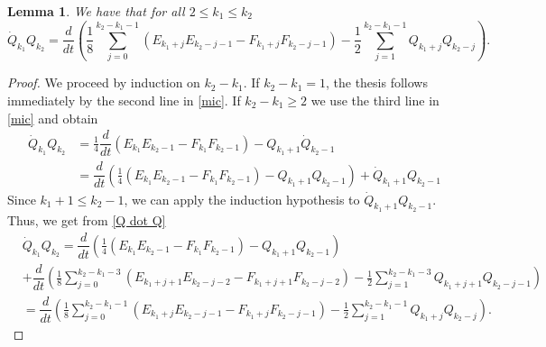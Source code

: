 \documentclass[reqno,11pt]{amsart}
\theoremstyle{plain}
\numberwithin{equation}{section}
\newtheorem{lemma}[theorem]{Lemma}
\newcommand{\ddt}{\dfrac{d}{dt}}
\begin{document}
{\begin{lemma}\label{provo}
	We have that for all $2\leq  k_1 \leq  k_2$
	\begin{equation}
		\dot{Q}_{k_1}Q_{k_2}=\ddt \left( \frac18 \sum_{j=0}^{k_2-k_1-1}(E_{k_1+j}E_{k_2-j-1}-F_{k_1+j}F_{k_2-j-1}) - \frac12 \sum_{j=1}^{k_2-k_1-1} Q_{k_1+j} Q_{k_2-j} \right).
	\end{equation}
\end{lemma}
\begin{proof}
	We proceed by induction on $k_2-k_1$. If $k_2-k_1=1$, the thesis follows immediately by the second line in \eqref{mic}.
	If $k_2-k_1\geq2$ we use the third line in \eqref{mic} and obtain
	\begin{equation}\label{Q dot Q}
		\begin{aligned}
			\dot{Q}_{k_1}Q_{k_2}
			&= \frac14\ddt ( E_{k_1}E_{k_2-1}-F_{k_1}F_{k_2-1}) - Q_{k_1+1} \dot Q_{k_2-1}
			\\
			&= \ddt\left( \frac14( E_{k_1}E_{k_2-1}-F_{k_1}F_{k_2-1}) - Q_{k_1+1} Q_{k_2-1}\right) + \dot Q_{k_1+1} Q_{k_2-1}
		\end{aligned}
	\end{equation}
	Since $k_1+1\leq k_2-1$, we can apply the induction hypothesis to $\dot Q_{k_1+1} Q_{k_2-1}$. Thus, we get from \eqref{Q dot Q}
	\begin{equation}\label{Q dot Q 2}
		\begin{aligned}
			&\dot{Q}_{k_1}Q_{k_2}
			= \ddt\left( \frac14( E_{k_1}E_{k_2-1}-F_{k_1}F_{k_2-1}) - Q_{k_1+1} Q_{k_2-1}\right)\\
			& + \ddt \left( \frac18 \sum_{j=0}^{k_2-k_1-3}(E_{k_1+j+1}E_{k_2-j-2}-F_{k_1+j+1}F_{k_2-j-2}) - \frac12 \sum_{j=1}^{k_2-k_1-3} Q_{k_1+j+1} Q_{k_2-j-1} \right)\\
			& = \ddt \left( \frac18 \sum_{j=0}^{k_2-k_1-1}(E_{k_1+j}E_{k_2-j-1}-F_{k_1+j}F_{k_2-j-1}) - \frac12 \sum_{j=1}^{k_2-k_1-1} Q_{k_1+j} Q_{k_2-j} \right).
		\end{aligned}
	\end{equation}
\end{proof}







}
\end{document}
